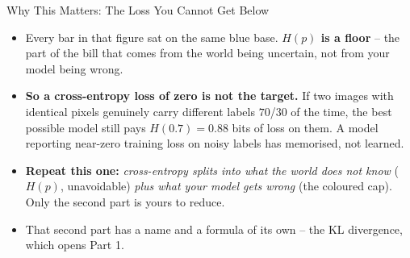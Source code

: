 \begin{frame}{Why This Matters: The Loss You Cannot Get Below}
\begin{itemize}
  \item Every bar in that figure sat on the same blue base. \textbf{$H(p)$ is a floor} -- the part of the bill that comes from the world being uncertain, not from your model being wrong.
  \pause
  \item \textbf{So a cross-entropy loss of zero is not the target.} If two images with identical pixels genuinely carry different labels $70$/$30$ of the time, the best possible model still pays $H(0.7) = 0.88$ bits of loss on them. A model reporting near-zero training loss on noisy labels has memorised, not learned.
  \pause
  \item \textbf{Repeat this one:} \emph{cross-entropy splits into what the world does not know} ($H(p)$, unavoidable) \emph{plus what your model gets wrong} (the coloured cap). Only the second part is yours to reduce.
  \pause
  \item That second part has a name and a formula of its own -- the KL divergence, which opens Part 1.
\end{itemize}
\end{frame}
